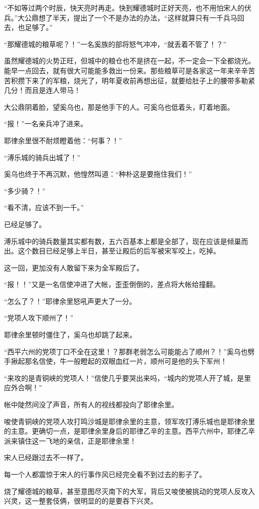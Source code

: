 “不如等过两个时辰，快天亮时再走。快到耀德城时正好天亮，也不用怕宋人的伏兵。”大公鼎想了半天，提出了一个不是办法的办法，“这样就算只有一千兵马回去，也足够了。”

“那耀德城的粮草呢？！”一名奚族的部将怒气冲冲，“就丢着不管了！？”

虽然耀德城的火势正旺，但城中的粮仓也不是挤在一起，不一定会一下全都烧光。能早一点回去，就有很大可能能多救出一份来。那些粮草可是各家这一年来辛辛苦苦积攒下来了的军粮，烧光了，明年夏收前再想出征，就要给肚子上的腰带多勒紧几分！而且是连人带马！

大公鼎阴着脸，望奚乌也，那是他手下的人。可奚乌也低着头，盯着地面。

“报！”一名亲兵冲了进来。

耶律余里很不耐烦瞪着他：“何事？！”

“溥乐城的骑兵出城了！”

奚乌也终于不再沉默，他惶然叫道：“种朴这是要拖住我们！”

“多少骑？！”

“看不清，应该不到一千。”

已经足够了。

溥乐城中的骑兵数量其实都有数，五六百基本上都是全部了，现在应该是倾巢而出。这个数目已经足够上半日，甚至让殿后的后军被宋军咬上，吃掉。

这一回，更加没有人敢留下来为全军殿后了。

“报！！”又是一名信使冲进了大帐，歪歪倒倒的，差点将大帐给撞翻。

“怎么了？！”耶律余里怒吼声更大了一分。

“党项人攻下顺州了！”

耶律余里顿时僵住了，奚乌也却跳了起来。

“西平六州的党项丁口不全在这里！？那群老弱怎么可能能占了顺州？！”奚乌也劈手揪起那名信使，牛一般瞪起的双眼血红一片，顺州可是他的头下军州！

“来攻的是青铜峡的党项人！”信使几乎要哭出来吗，“城内的党项人开了城，是里应外合啊！”

帐中陡然间没了声音，所有人的视线都投向了耶律余里。

唆使青铜峡的党项人攻打鸣沙城是耶律余里的主意，领军攻打溥乐城也是耶律余里的主意。更确切一点，是耶律余里身后的耶律乙辛的主意。西平六州中，耶律乙辛派来镇住这一飞地的亲信，正是耶律余里！

宋人已经跟过去不一样了。

每一个人都震惊于宋人的行事作风已经完全看不到过去的影子了。

烧了耀德城的粮草，甚至意图尽灭南下的大军，背后又唆使被挑动的党项人反攻入兴灵，这一整套伎俩，很明显的的是要吞下兴灵。

